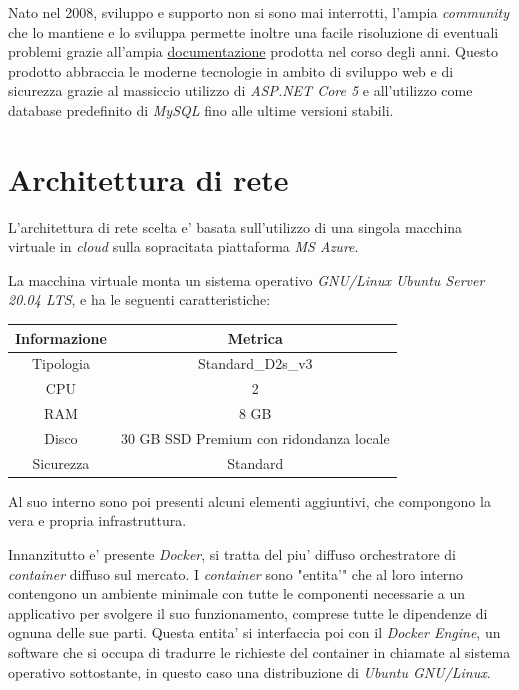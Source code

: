 \documentclass[a4paper]{report}
\begin{document}
			Nato nel 2008, sviluppo e supporto non si sono mai interrotti, l'ampia \emph{community} che lo mantiene
			e lo sviluppa permette inoltre una facile risoluzione di eventuali problemi grazie all'ampia
			\href{https://docs.nopcommerce.com/en/developer/index.html?utm\_source=github&utm\_medium=referral&utm\_campaign=documentation&utm\_content=text}{documentazione}
			prodotta nel corso degli anni. Questo prodotto abbraccia le moderne tecnologie in ambito di sviluppo web e
			di sicurezza grazie al massiccio utilizzo di \emph{ASP.NET Core 5} e all'utilizzo come database predefinito
			di \emph{MySQL} fino alle ultime versioni stabili. 
	\section{Architettura di rete}
		L'architettura di rete scelta e' basata sull'utilizzo di una singola macchina virtuale in \emph{cloud} sulla
		sopracitata piattaforma \emph{MS Azure}.

		La macchina virtuale monta un sistema operativo \emph{GNU/Linux Ubuntu Server 20.04 LTS}, e ha le seguenti
		caratteristiche:
		\begin{center}
			\begin{tabular}{c|c}
				Informazione & Metrica \\
				\hline
				Tipologia & Standard\_D2s\_v3 \\
				CPU & 2 \\
				RAM & 8 GB \\
				Disco & 30 GB SSD Premium con ridondanza locale \\
				Sicurezza & Standard \\
			\end{tabular}
		\end{center}

		Al suo interno sono poi presenti alcuni elementi aggiuntivi, che compongono la vera e propria infrastruttura.

		Innanzitutto e' presente \emph{Docker}, si tratta del piu' diffuso orchestratore di \emph{container} diffuso
		sul mercato. I \emph{container} sono "entita'" che al loro interno contengono un ambiente minimale con tutte le
		componenti necessarie a un applicativo per svolgere il suo funzionamento, comprese tutte le dipendenze di ognuna
		delle sue parti. Questa entita' si interfaccia poi con il \emph{Docker Engine}, un software che si occupa di
		tradurre le richieste del container in chiamate al sistema operativo sottostante, in questo caso una
		distribuzione di \emph{Ubuntu GNU/Linux}.
\end{document}
